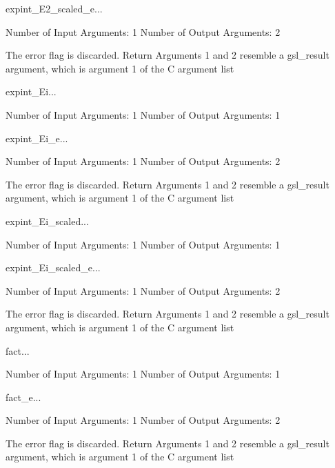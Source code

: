 \begin{funcdesc}{expint_E2_scaled_e}{...}

    Number of Input  Arguments:  1
    Number of Output Arguments:  2

The error flag is discarded.
Return Arguments 1 and 2 resemble a gsl_result argument,
	which is  argument 1 of the C argument list

\end{funcdesc}

\begin{funcdesc}{expint_Ei}{...}

    Number of Input  Arguments:  1
    Number of Output Arguments:  1
\end{funcdesc}

\begin{funcdesc}{expint_Ei_e}{...}

    Number of Input  Arguments:  1
    Number of Output Arguments:  2

The error flag is discarded.
Return Arguments 1 and 2 resemble a gsl_result argument,
	which is  argument 1 of the C argument list

\end{funcdesc}

\begin{funcdesc}{expint_Ei_scaled}{...}

    Number of Input  Arguments:  1
    Number of Output Arguments:  1
\end{funcdesc}

\begin{funcdesc}{expint_Ei_scaled_e}{...}

    Number of Input  Arguments:  1
    Number of Output Arguments:  2

The error flag is discarded.
Return Arguments 1 and 2 resemble a gsl_result argument,
	which is  argument 1 of the C argument list

\end{funcdesc}

\begin{funcdesc}{fact}{...}

    Number of Input  Arguments:  1
    Number of Output Arguments:  1
\end{funcdesc}

\begin{funcdesc}{fact_e}{...}

    Number of Input  Arguments:  1
    Number of Output Arguments:  2

The error flag is discarded.
Return Arguments 1 and 2 resemble a gsl_result argument,
	which is  argument 1 of the C argument list

\end{funcdesc}

